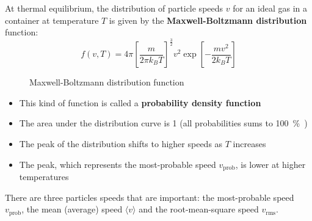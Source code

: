 At thermal equilibrium, the distribution of particle speeds $v$ for an ideal
gas in a container at temperature $T$ is given by the
\textbf{Maxwell-Boltzmann distribution} function:
\begin{equation}
  f(v,T)=4\pi\left[\frac m{2\pi k_BT}\right]^{\frac32}v^2
  \exp\left[-\frac{mv^2}{2k_BT}\right]
\end{equation}
%

\begin{figure}[ht]
  \centering
  \caption{Maxwell-Boltzmann distribution function}
\end{figure}

\begin{itemize}
\item This kind of function is called a \textbf{probability density
  function}
\item The area under the distribution curve is 1 (all probabilities sums to
  \SI{100}\percent)
\item The peak of the distribution shifts to higher speeds as $T$ increases
\item The peak, which represents the most-probable speed $v_\text{prob}$,
  is lower at higher temperatures
\end{itemize}
There are three particles speeds that are important: the most-probable speed
$v_\text{prob}$, the mean (average) speed $\langle v \rangle$ and the
root-mean-square speed $v_\text{rms}$.
\begin{figure}[ht]
  \centering
\end{figure}

